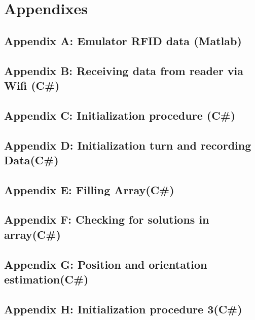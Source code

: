 \section{Appendixes}

\subsection{Appendix A: Emulator RFID data (Matlab)}\label{Sec_AppA}
\scriptsize


\subsection{Appendix B: Receiving data from reader via Wifi (C\#)}\label{Sec_AppB}
\scriptsize


\pagebreak
\subsection{Appendix C: Initialization procedure (C\#)}\label{Sec_AppC}
\scriptsize


\subsection{Appendix D: Initialization turn and recording Data(C\#)}\label{Sec_AppD}
\scriptsize


\subsection{Appendix E: Filling Array(C\#)}\label{Sec_AppE}
\scriptsize


\subsection{Appendix F: Checking for solutions in array(C\#)}\label{Sec_AppF}
\scriptsize


\subsection{Appendix G: Position and orientation estimation(C\#)}\label{Sec_AppG}
\scriptsize


\subsection{Appendix H: Initialization procedure 3(C\#)}\label{Sec_AppH}
\scriptsize


